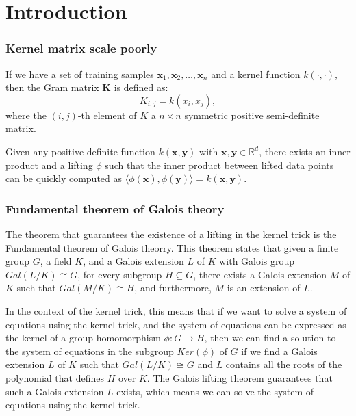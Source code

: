 \section{Introduction}
\begin{frame}
  \frametitle{Kernel matrix scale poorly}

  If we have a set of training samples ${\mathbf{x}_1, \mathbf{x}_2, \dots, \mathbf{x}_n}$ and a kernel function $k(\cdot, \cdot)$, then the Gram matrix $\mathbf{K}$ is defined as:
  \begin{equation}
    K_{i,j} = k(x_i, x_j),
  \end{equation}
  where the  $(i,j)$-th element of $K$ a $n \times n$ symmetric positive semi-definite matrix. 

  Given any positive definite function $k(\mathbf{x},\mathbf{y})$ with $\mathbf{x},\mathbf{y}\in\mathbb{R}^d$, there exists an inner product and a lifting $\phi$ such that the inner product between lifted data points can be quickly computed as $\langle \phi(\mathbf{x}), \phi(\mathbf{y})\rangle = k(\mathbf{x},\mathbf{y})$.

\end{frame}

\begin{frame}
  \frametitle{Fundamental theorem of Galois theory}
 \cite{wiki:Fundamental_theorem_of_Galois_theory}
  The theorem that guarantees the existence of a lifting in the kernel trick is the Fundamental theorem of Galois theorry. This theorem states that given a finite group $G$, a field $K$, and a Galois extension $L$ of $K$ with Galois group $Gal(L/K) \cong G$, for every subgroup $H \subseteq G$, there exists a Galois extension $M$ of $K$ such that $Gal(M/K) \cong H$, and furthermore, $M$ is an extension of $L$.

In the context of the kernel trick, this means that if we want to solve a system of equations using the kernel trick, and the system of equations can be expressed as the kernel of a group homomorphism $\phi: G \rightarrow H$, then we can find a solution to the system of equations in the subgroup $Ker(\phi)$ of $G$ if we find a Galois extension $L$ of $K$ such that $Gal(L/K) \cong G$ and $L$ contains all the roots of the polynomial that defines $H$ over $K$. The Galois lifting theorem guarantees that such a Galois extension $L$ exists, which means we can solve the system of equations using the kernel trick.

\end{frame}

